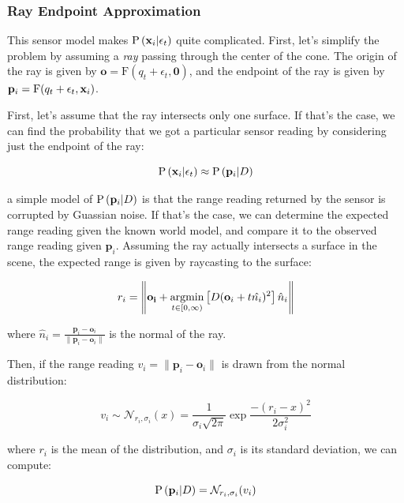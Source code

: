 \documentclass{article}
\begin{document}
\subsubsection{Ray Endpoint Approximation} 
This sensor model makes $\text{P}\left(\mathbf{x}_i | \epsilon_t\right)$ quite complicated. First, let's simplify the problem by assuming a \textit{ray} passing through the center of the cone. The origin of the ray is given by $ \mathbf{o} = \text{F}(q_t +
\epsilon_t, \mathbf{0})$, and the endpoint of the ray is given by $\mathbf{p}_i =\text{F}(q_t + \epsilon_t, \mathbf{x}_i)$. 

First, let's assume that the ray intersects only one surface. If that's the case, we can find the probability that we got a particular sensor reading by considering just the endpoint of the ray:

\begin{equation}
\text{P}\left( \mathbf{x}_i | \epsilon_t \right) \approx \text{P} \left(\mathbf{p}_i | D \right)
\end{equation}

\noindent a simple model of $\text{P} \left(\mathbf{p}_i | D \right)$ is that the range reading returned by the sensor is corrupted by Guassian noise. If that's the case, we can determine the expected range reading given the known world model, and
compare it to the observed range reading given $\mathbf{p}_i$. Assuming the ray actually intersects a surface in the scene, the expected range is given by raycasting to the surface:

\begin{equation}
r_i = \left\|\mathbf{o_i} +  \argmin_{t \in [0, \infty)} \left[D(\mathbf{o}_i + t \hat{n_i})^2\right] \hat{n}_i\right\|
\end{equation}

\noindent where $\hat{n}_i = \frac{\mathbf{p}_i - \mathbf{o}_i}{\| \mathbf{p}_i - \mathbf{o}_i\|}$ is the normal of the ray. 

Then, if the range reading $v_i =\| \mathbf{p}_i - \mathbf{o}_i\| $ is drawn from the normal distribution:

\begin{equation}
v_i \sim \mathcal{N}_{r_i, \sigma_i}(x)= \frac{1}{\sigma_i \sqrt{2 \pi}} \exp{\frac{-(r_i - x)^2}{2 \sigma_i^2}}
\end{equation}

\noindent where $r_i$ is the mean of the distribution, and $\sigma_i$ is its standard deviation, we can compute:

\begin{equation}
\text{P} \left(\mathbf{p}_i | D \right) = \mathcal{N}_{r_i, \sigma_i}(v_i)
\end{equation} 
\end{document}
